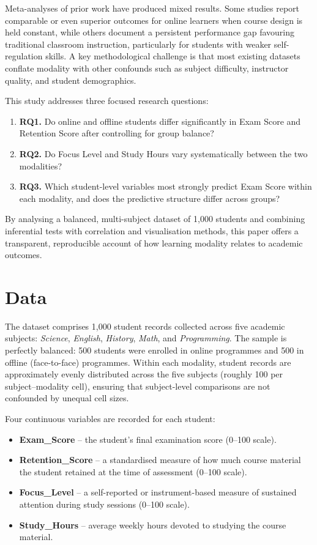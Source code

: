 \documentclass[11pt]{article}
\begin{document}
Meta-analyses of prior work have produced mixed results.
Some studies report comparable or even superior outcomes for online learners when
course design is held constant, while others document a persistent performance gap
favouring traditional classroom instruction, particularly for students with weaker
self-regulation skills.
A key methodological challenge is that most existing datasets conflate modality with
other confounds such as subject difficulty, instructor quality, and student
demographics.

This study addresses three focused research questions:
\begin{enumerate}
  \item \textbf{RQ1.} Do online and offline students differ significantly in Exam
        Score and Retention Score after controlling for group balance?
  \item \textbf{RQ2.} Do Focus Level and Study Hours vary systematically between
        the two modalities?
  \item \textbf{RQ3.} Which student-level variables most strongly predict Exam
        Score within each modality, and does the predictive structure differ
        across groups?
\end{enumerate}

By analysing a balanced, multi-subject dataset of 1,000 students and combining
inferential tests with correlation and visualisation methods, this paper offers
a transparent, reproducible account of how learning modality relates to academic
outcomes.

\section{Data}

The dataset comprises 1,000 student records collected across five academic subjects:
\textit{Science}, \textit{English}, \textit{History}, \textit{Math}, and
\textit{Programming}.
The sample is perfectly balanced: 500 students were enrolled in online programmes and
500 in offline (face-to-face) programmes.
Within each modality, student records are approximately evenly distributed across
the five subjects (roughly 100 per subject--modality cell), ensuring that
subject-level comparisons are not confounded by unequal cell sizes.

Four continuous variables are recorded for each student:
\begin{itemize}
  \item \textbf{Exam\_Score} -- the student's final examination score (0--100 scale).
  \item \textbf{Retention\_Score} -- a standardised measure of how much course material
        the student retained at the time of assessment (0--100 scale).
  \item \textbf{Focus\_Level} -- a self-reported or instrument-based measure of
        sustained attention during study sessions (0--100 scale).
  \item \textbf{Study\_Hours} -- average weekly hours devoted to studying the course
        material.
\end{itemize}
\end{document}

